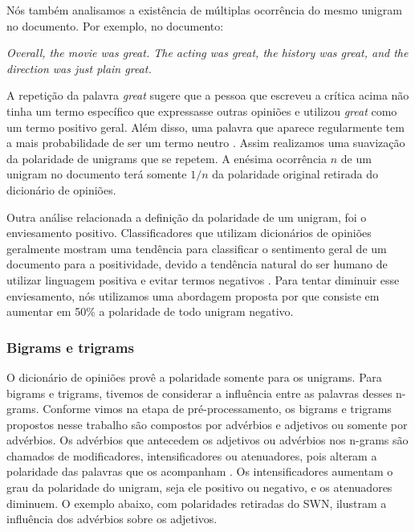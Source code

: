 Nós também analisamos a existência de múltiplas ocorrência do mesmo unigram no documento. Por exemplo, no documento:

\textit{Overall, the movie was great. The acting was great, the history was great, and the direction was just plain great.}

A repetição da palavra \textit{great} sugere que a pessoa que escreveu a crítica acima não tinha um termo específico que expressasse outras opiniões e utilizou \textit{great} como um termo positivo geral. Além disso, uma palavra que aparece regularmente tem a mais probabilidade de ser um termo neutro \cite{taboada2011lexicon}. Assim realizamos uma suavização da polaridade de unigrams que se repetem. A enésima ocorrência $n$ de um unigram no documento terá somente $1/n$ da polaridade original retirada do dicionário de opiniões.

Outra análise relacionada a definição da polaridade de um unigram, foi o enviesamento positivo. Classificadores que utilizam dicionários de opiniões geralmente mostram uma tendência para classificar o sentimento geral de um documento para a positividade, devido a tendência natural do ser humano de utilizar linguagem positiva e evitar termos negativos \cite{boucher1969pollyanna, kennedy2006sentiment}. Para tentar diminuir esse enviesamento, nós utilizamos uma abordagem proposta por  que consiste em aumentar em 50\% a polaridade de todo unigram negativo. 

\subsubsection{Bigrams e trigrams}

O dicionário de opiniões provê a polaridade somente para os unigrams. Para bigrams e trigrams, tivemos de considerar a influência entre as palavras desses n-grams. Conforme vimos na etapa de pré-processamento, os bigrams e trigrams propostos nesse trabalho são compostos por advérbios e adjetivos ou somente por advérbios. Os advérbios que antecedem os adjetivos ou advérbios nos n-grams são chamados de modificadores, intensificadores ou atenuadores, pois alteram a polaridade das palavras que os acompanham \cite{voll2007not}. Os intensificadores aumentam o grau da polaridade do unigram, seja ele positivo ou negativo, e os atenuadores diminuem. O exemplo abaixo, com polaridades retiradas do SWN, ilustram a influência dos advérbios sobre os adjetivos.  

